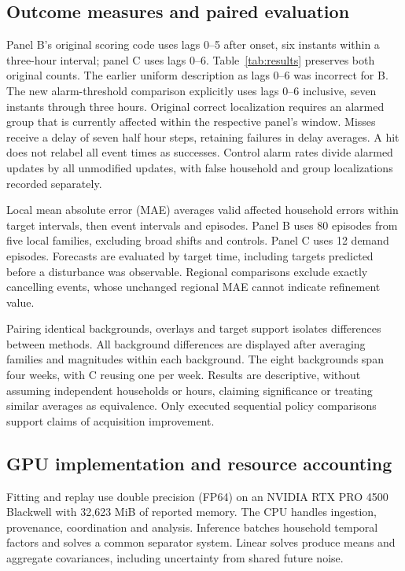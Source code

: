 \documentclass[conference]{IEEEtran}
\begin{document}
\subsection{Outcome measures and paired evaluation}
Panel B's original scoring code uses lags 0--5 after onset, six instants within a three-hour interval; panel C uses lags 0--6. Table~\ref{tab:results} preserves both original counts. The earlier uniform description as lags 0--6 was incorrect for B. The new alarm-threshold comparison explicitly uses lags 0--6 inclusive, seven instants through three hours. Original correct localization requires an alarmed group that is currently affected within the respective panel's window. Misses receive a delay of seven half hour steps, retaining failures in delay averages. A hit does not relabel all event times as successes. Control alarm rates divide alarmed updates by all unmodified updates, with false household and group localizations recorded separately.

Local mean absolute error (MAE) averages valid affected household errors within target intervals, then event intervals and episodes. Panel B uses 80 episodes from five local families, excluding broad shifts and controls. Panel C uses 12 demand episodes. Forecasts are evaluated by target time, including targets predicted before a disturbance was observable. Regional comparisons exclude exactly cancelling events, whose unchanged regional MAE cannot indicate refinement value.

Pairing identical backgrounds, overlays and target support isolates differences between methods. All background differences are displayed after averaging families and magnitudes within each background. The eight backgrounds span four weeks, with C reusing one per week. Results are descriptive, without assuming independent households or hours, claiming significance or treating similar averages as equivalence. Only executed sequential policy comparisons support claims of acquisition improvement.




\subsection{GPU implementation and resource accounting}
Fitting and replay use double precision (FP64) on an NVIDIA RTX PRO 4500 Blackwell with 32,623 MiB of reported memory. The CPU handles ingestion, provenance, coordination and analysis. Inference batches household temporal factors and solves a common separator system. Linear solves produce means and aggregate covariances, including uncertainty from shared future noise.
\end{document}
